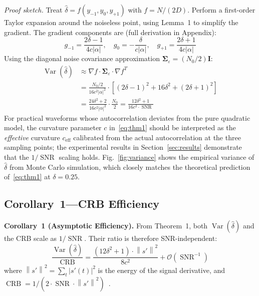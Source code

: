 \documentclass[a4paper,fleqn]{cas-dc}
\DeclareMathOperator{\Var}{Var}
\DeclareMathOperator{\SNR}{SNR}
\DeclareMathOperator{\CRB}{CRB}
\newcommand{\bigO}{\mathcal{O}}
\newcommand{\norm}[1]{\left\lVert #1 \right\rVert}
\begin{document}
\textit{Proof sketch.} Treat $\hat{\delta} = f(y_{-1}, y_0, y_{+1})$ with $f = N/(2D)$. Perform a first-order Taylor expansion around the noiseless point, using Lemma~1 to simplify the gradient. The gradient components are (full derivation in Appendix):
\begin{equation}
g_{-1} = \frac{2\delta - 1}{4c|\alpha|}, \quad
g_0 = -\frac{\delta}{c|\alpha|}, \quad
g_{+1} = \frac{2\delta + 1}{4c|\alpha|}
\label{eq:grad}
\end{equation}
Using the diagonal noise covariance approximation $\bm{\Sigma}_\varepsilon = (N_0/2)\mathbf{I}$:
\begin{align}
\Var(\hat{\delta}) &\approx \nabla f \cdot \bm{\Sigma}_\varepsilon \cdot \nabla f^T \nonumber\\
&= \frac{N_0/2}{16c^2|\alpha|^2} \cdot [(2\delta-1)^2 + 16\delta^2 + (2\delta+1)^2] \nonumber\\
&= \frac{24\delta^2 + 2}{16c^2|\alpha|^2} \cdot \frac{N_0}{2}
   = \frac{12\delta^2 + 1}{16c^2 \cdot \SNR} \nonumber
\end{align}
For practical waveforms whose autocorrelation deviates from the pure quadratic model, the curvature parameter $c$ in~\eqref{eq:thm1} should be interpreted as the \emph{effective} curvature $c_{\text{eff}}$ calibrated from the actual autocorrelation at the three sampling points; the experimental results in Section~\ref{sec:results} demonstrate that the $1/\SNR$ scaling holds. Fig.~\ref{fig:variance} shows the empirical variance of $\hat{\delta}$ from Monte Carlo simulation, which closely matches the theoretical prediction of~\eqref{eq:thm1} at $\delta=0.25$.

\subsection{Corollary~1---CRB Efficiency}

\textbf{Corollary~1 (Asymptotic Efficiency).} From Theorem~1, both $\Var(\hat{\delta})$ and the CRB scale as $1/\SNR$. Their ratio is therefore SNR-independent:
\begin{equation}
\frac{\Var(\hat{\delta})}{\CRB} = \frac{(12\delta^2 + 1) \cdot \norm{s'}^2}{8c^2} + \bigO(\SNR^{-1})
\label{eq:cor1}
\end{equation}
where $\norm{s'}^2 = \sum_t |s'(t)|^2$ is the energy of the signal derivative, and $\CRB = 1/(2 \cdot \SNR \cdot \norm{s'}^2)$~\cite{kay1993}.
\end{document}
